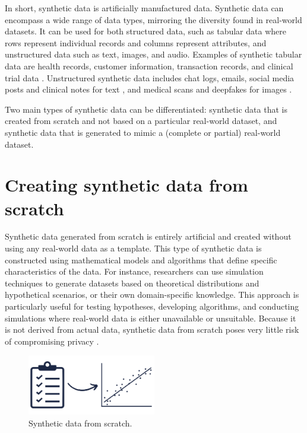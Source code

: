 

\label{syntheticdata}

In short, synthetic data is artificially manufactured data. Synthetic data can encompass a wide range of data types, mirroring the diversity found in real-world datasets. It can be used for both structured data, such as tabular data where rows represent individual records and columns represent attributes, and unstructured data such as text, images, and audio. Examples of synthetic tabular data are health records, customer information, transaction records, and clinical trial data \cite{el2020practical,yan2022multifaceted,hradec2022multipurpose}. Unstructured synthetic data includes chat logs, emails, social media posts and clinical notes for text \cite{sagduyu2018synthetic,li2021synthetic}, and medical scans and deepfakes for images \cite{patel2023deepfake,paproki2024synthetic}. 

Two main types of synthetic data can be differentiated: synthetic data that is created from scratch and not based on a particular real-world dataset, and synthetic data that is generated to mimic a (complete or partial) real-world dataset. 

\section{Creating synthetic data from scratch}
Synthetic data generated from scratch is entirely artificial and created without using any real-world data as a template. This type of synthetic data is constructed using mathematical models and algorithms that define specific characteristics of the data. For instance, researchers can use simulation techniques to generate datasets based on theoretical distributions and hypothetical scenarios, or their own domain-specific knowledge. This approach is particularly useful for testing hypotheses, developing algorithms, and conducting simulations where real-world data is either unavailable or unsuitable. Because it is not derived from actual data, synthetic data from scratch poses very little risk of compromising privacy \cite{el2020practical,soltana2017synthetic}. 

\vspace{5pt}
\begin{figure}[h!]
    \centering
    \includegraphics[width=0.5\textwidth]{Images/SyntheticData_1.png}
    \caption{Synthetic data from scratch.}
    \label{fig:sample_image}
\end{figure}
\vspace{5pt}

